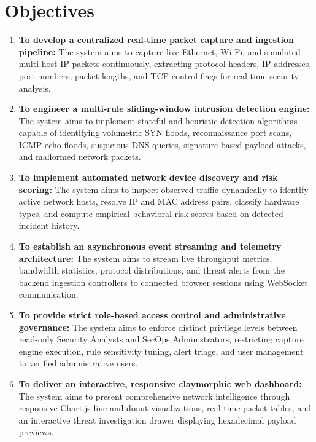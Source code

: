 \documentclass[a4paper,12pt]{report}
\begin{document}
	\section{Objectives}
	\begin{enumerate}
		\item \textbf{To develop a centralized real-time packet capture and ingestion pipeline:}
		The system aims to capture live Ethernet, Wi-Fi, and simulated multi-host IP packets continuously, extracting protocol headers, IP addresses, port numbers, packet lengths, and TCP control flags for real-time security analysis.
		
		\item \textbf{To engineer a multi-rule sliding-window intrusion detection engine:}
		The system aims to implement stateful and heuristic detection algorithms capable of identifying volumetric SYN floods, reconnaissance port scans, ICMP echo floods, suspicious DNS queries, signature-based payload attacks, and malformed network packets.
		
		\item \textbf{To implement automated network device discovery and risk scoring:}
		The system aims to inspect observed traffic dynamically to identify active network hosts, resolve IP and MAC address pairs, classify hardware types, and compute empirical behavioral risk scores based on detected incident history.
		
		\item \textbf{To establish an asynchronous event streaming and telemetry architecture:}
		The system aims to stream live throughput metrics, bandwidth statistics, protocol distributions, and threat alerts from the backend ingestion controllers to connected browser sessions using WebSocket communication.
		
		\item \textbf{To provide strict role-based access control and administrative governance:}
		The system aims to enforce distinct privilege levels between read-only Security Analysts and SecOps Administrators, restricting capture engine execution, rule sensitivity tuning, alert triage, and user management to verified administrative users.
		
		\item \textbf{To deliver an interactive, responsive claymorphic web dashboard:}
		The system aims to present comprehensive network intelligence through responsive Chart.js line and donut visualizations, real-time packet tables, and an interactive threat investigation drawer displaying hexadecimal payload previews.
		

\end{enumerate}
\end{document}
